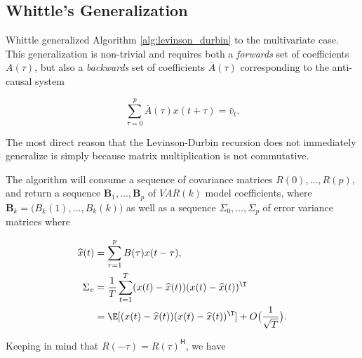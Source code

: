 \documentclass[12pt]{article}
\begin{document}
\subsection{Whittle's Generalization}
Whittle \cite{whittle_generalized_levinson_durbin} generalized
Algorithm \ref{alg:levinson_durbin} to the multivariate case.  This
generalization is non-trivial and requires both a \textit{forwards}
set of coefficients $A(\tau)$, but also a \textit{backwards} set of
coefficients $\bar{A}(\tau)$ corresponding to the anti-causal system

\begin{equation}
  \sum_{\tau = 0}^p\bar{A}(\tau)x(t + \tau) = \bar{v}_t.
\end{equation}

The most direct reason that the Levinson-Durbin recursion does not
immediately generalize is simply because matrix multiplication is not
commutative.

The algorithm will consume a sequence of covariance matrices
$R(0), \ldots, R(p)$, and return a sequence
$\mathbf{B}_1, \ldots, \mathbf{B}_p$ of $VAR(k)$ model coefficients,
where $\mathbf{B}_k = \big(B_k(1), \ldots, B_k(k) \big)$ as well as a
sequence $\Sigma_0, \ldots, \Sigma_p$ of error variance matrices where

\begin{equation}
  \begin{aligned}
    \widehat{x}(t) &= \sum_{\tau = 1}^p B(\tau)x(t - \tau),\\
    \Sigma_v &= \frac{1}{T} \sum_{t = 1}^T (x(t) - \widehat{x}(t))(x(t) - \widehat{x}(t))^\T\\
    &= \E[(x(t) - \widehat{x}(t))(x(t) - \widehat{x}(t))^\T] + O\big(\frac{1}{\sqrt{T}}\big).
  \end{aligned}
\end{equation}

Keeping in mind that $R(-\tau) = R(\tau)^{\mathsf{H}}$, we have
\end{document}
